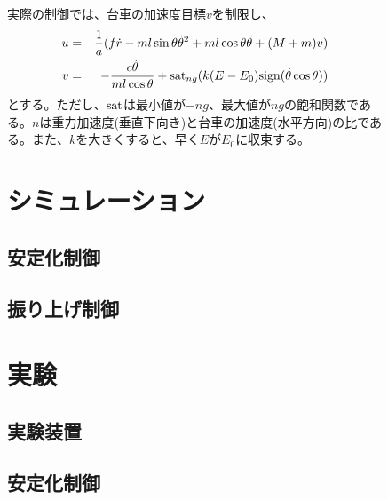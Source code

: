 \documentclass[a4j,11pt,twoside]{ujbook}
\begin{document}
\begin{figure}[htbp]
\begin{center}
		実際の制御では、台車の加速度目標$v$を制限し、
		\begin{eqnarray}
			u &=& \frac{1}{a}(f\dot{r} - ml\sin\theta\dot{\theta}^{2} + ml\cos\theta\ddot{\theta} + (M + m)v)\\
			v &=& -\frac{c\dot{\theta}}{ml\cos\theta} + {\rm sat}_{ng}(k(E-E_{0}){\rm sign}(\dot\theta\cos\theta))
		\end{eqnarray}
		とする。ただし、$\rm{sat}$は最小値が$-ng$、最大値が$ng$の飽和関数である。$n$は重力加速度(垂直下向き)と台車の加速度(水平方向)の比である。また、$k$を大きくすると、早く$E$が$E_{0}$に収束する。
		
\chapter{シミュレーション}
	\section{安定化制御}
	\section{振り上げ制御}

\chapter{実験}
	\section{実験装置}
	
	\section{安定化制御}

\end{center}
\end{figure}
\end{document}

